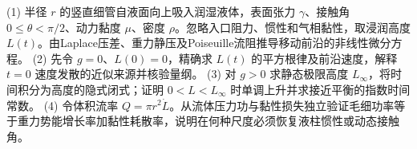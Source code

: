 (1) 半径 \(r\) 的竖直细管自液面向上吸入润湿液体，表面张力 \(\gamma\)、接触角 \(0\le\theta<\pi/2\)、动力黏度 \(\mu\)、密度 \(\rho\)。忽略入口阻力、惯性和气相黏性，取浸润高度 \(L(t)\)。由Laplace压差、重力静压及Poiseuille流阻推导移动前沿的非线性微分方程。
(2) 先令 \(g=0\)、\(L(0)=0\)，精确求 \(L(t)\) 的平方根律及前沿速度，解释 \(t=0\) 速度发散的近似来源并核验量纲。
(3) 对 \(g>0\) 求静态极限高度 \(L_\infty\)，将时间积分为高度的隐式闭式；证明 \(0<L<L_\infty\) 时单调上升并求接近平衡的指数时间常数。
(4) 令体积流率 \(Q=\pi r^2\dot L\)。从流体压力功与黏性损失独立验证毛细功率等于重力势能增长率加黏性耗散率，说明在何种尺度必须恢复液柱惯性或动态接触角。
